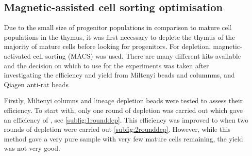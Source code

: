 \subsection{Magnetic-assisted cell sorting optimisation}

Due to the small size of progenitor populations in comparison to mature cell populations in the thymus, it was first necessary to deplete the thymus of the majority of mature cells before looking for progenitors.
For depletion, magnetic-activated cell sorting (MACS) was used.
There are many different kits available and the decision on which to use for the experiments was taken after investigating the efficiency and yield from Miltenyi beads and columnms, and Qiagen anti-rat beads 

Firstly, Miltenyi columns and lineage depletion beads were tested to assess their efficiency.
To start with, only one round of depletion was carried out which gave an efficiency of , see \cref{subfig:1rounddep}.
This efficiency was improved to  when two rounds of depletion were carried out \cref{subfig:2rounddep}. 
However, while this method gave a very pure sample with very few mature cells remaining, the yield was not very good.

